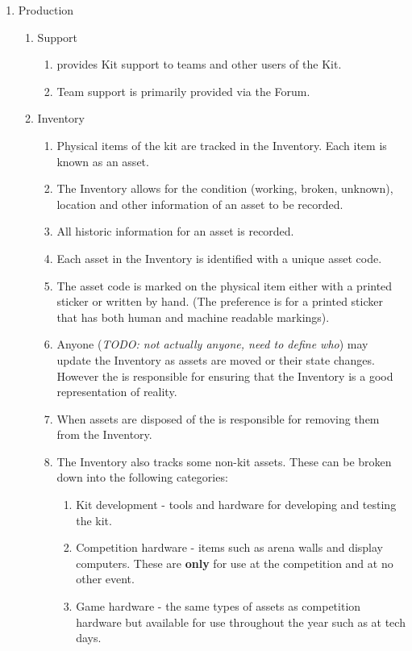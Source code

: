 \begin{enumerate}
\item Production
  \begin{enumerate}
  \item Support
    \begin{enumerate}
      \item {} provides Kit support to teams and other users of the Kit.
      \item Team support is primarily provided via the Forum.
    \end{enumerate}
  \item Inventory
    \begin{enumerate}
      \item Physical items of the kit are tracked in the Inventory. Each item is known as an asset.
      \item The Inventory allows for the condition (working, broken, unknown), location and other information of an asset to be recorded.
      \item All historic information for an asset is recorded.
      \item Each asset in the Inventory is identified with a unique asset code.
      \item The asset code is marked on the physical item either with a printed sticker or written by hand. (The preference is for a printed sticker that has both human and machine readable markings).
      \item Anyone (\emph{TODO: not actually anyone, need to define who}) may update the Inventory as assets are moved or their state changes. However the  is responsible for ensuring that the Inventory is a good representation of reality.
      \item When assets are disposed of the  is responsible for removing them from the Inventory.
      \item The Inventory also tracks some non-kit assets. These can be broken down into the following categories:
        \begin{enumerate}
          \item Kit development - tools and hardware for developing and testing the kit.
          \item Competition hardware - items such as arena walls and display computers. These are \textbf{only} for use at the competition and at no other event.
          \item Game hardware - the same types of assets as competition hardware but available for use throughout the year such as at tech days.

\end{enumerate}
\end{enumerate}
\end{enumerate}
\end{enumerate}
